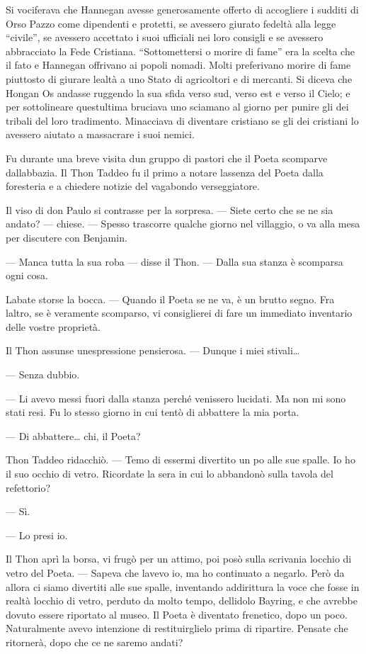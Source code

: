 Si vociferava che Hannegan avesse generosamente offerto di accogliere i
sudditi di Orso Pazzo come dipendenti e protetti, se avessero giurato
fedeltà alla legge ``civile'', se avessero accettato i suoi ufficiali
nei loro consigli e se avessero abbracciato la Fede Cristiana.
``Sottomettersi o morire di fame'' era la scelta che il fato e Hannegan
offrivano ai popoli nomadi. Molti preferivano morire di fame piuttosto
di giurare lealtà a uno Stato di agricoltori e di mercanti. Si diceva
che Hongan Os andasse ruggendo la sua sfida verso sud, verso est e verso
il Cielo; e per sottolineare quest\textquotesingle ultima bruciava uno
sciamano al giorno per punire gli dei tribali del loro tradimento.
Minacciava di diventare cristiano se gli dei cristiani lo avessero
aiutato a massacrare i suoi nemici.

Fu durante una breve visita d\textquotesingle un gruppo di pastori che
il Poeta scomparve dall\textquotesingle abbazia. Il Thon Taddeo fu il
primo a notare l\textquotesingle assenza del Poeta dalla foresteria e a
chiedere notizie del vagabondo verseggiatore.

Il viso di don Paulo si contrasse per la sorpresa. --- Siete certo che
se ne sia andato? --- chiese. --- Spesso trascorre qualche giorno nel
villaggio, o va alla mesa per discutere con Benjamin.

--- Manca tutta la sua roba --- disse il Thon. --- Dalla sua stanza è
scomparsa ogni cosa.

L\textquotesingle abate storse la bocca. --- Quando il Poeta se ne va, è
un brutto segno. Fra l\textquotesingle altro, se è veramente scomparso,
vi consiglierei di fare un immediato inventario delle vostre proprietà.

Il Thon assunse un\textquotesingle espressione pensierosa. --- Dunque i
miei stivali\ldots{}

--- Senza dubbio.

--- Li avevo messi fuori dalla stanza perché venissero lucidati. Ma non
mi sono stati resi. Fu lo stesso giorno in cui tentò di abbattere la mia
porta.

--- Di abbattere\ldots{} chi, il Poeta?

Thon Taddeo ridacchiò. --- Temo di essermi divertito un
po\textquotesingle{} alle sue spalle. Io ho il suo occhio di vetro.
Ricordate la sera in cui lo abbandonò sulla tavola del refettorio?

--- Sì.

--- Lo presi io.

Il Thon aprì la borsa, vi frugò per un attimo, poi posò sulla scrivania
l\textquotesingle occhio di vetro del Poeta. --- Sapeva che
l\textquotesingle avevo io, ma ho continuato a negarlo. Però da allora
ci siamo divertiti alle sue spalle, inventando addirittura la voce che
fosse in realtà l\textquotesingle occhio di vetro, perduto da molto
tempo, dell\textquotesingle idolo Bayring, e che avrebbe dovuto essere
riportato al museo. Il Poeta è diventato frenetico, dopo un poco.
Naturalmente avevo intenzione di restituirglielo prima di ripartire.
Pensate che ritornerà, dopo che ce ne saremo andati?


